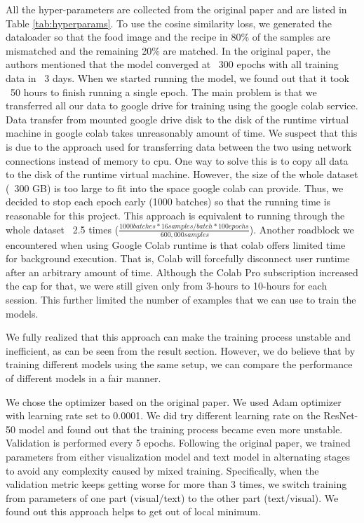\documentclass[10pt,twocolumn,letterpaper]{article}
\begin{document}
All the hyper-parameters are collected from the original paper and are listed in Table \ref{tab:hyperparams}.  To use the cosine similarity loss, we generated the dataloader so that the food image and the recipe in 80\% of the samples are mismatched and the remaining 20\% are matched.  In the original paper, the authors mentioned that the model converged at ~300 epochs with all training data in ~3 days.  When we started running the model, we found out that it took ~50 hours to finish running a single epoch.  The main problem is that we transferred all our data to google drive for training using the google colab service.  Data transfer from mounted google drive disk to the disk of the runtime virtual machine in google colab takes unreasonably amount of time.  We suspect that this is due to the approach used for transferring data between the two using network connections instead of memory to cpu.  One way to solve this is to copy all data to the disk of the runtime virtual machine.  However, the size of the whole dataset (~300 GB) is too large to fit into the space google colab can provide.  Thus, we decided to stop each epoch early (1000 batches) so that the running time is reasonable for this project.  This approach is equivalent to running through the whole dataset ~2.5 times (\(\frac{1000 batches * 16 samples/batch * 100 epochs}{~600,000 samples}\)).  Another roadblock we encountered when using Google Colab runtime is that colab offers limited time for background execution.  That is, Colab will forcefully disconnect user runtime after an arbitrary amount of time. Although the Colab Pro subscription increased the cap for that, we were still given only from 3-hours to 10-hours for each session. This further limited the number of examples that we can use to train the models. 

We fully realized that this approach can make the training process unstable and inefficient, as can be seen from the result section.  However, we do believe that by training different models using the same setup, we can compare the performance of different models in a fair manner.

We chose the optimizer based on the original paper.  We used Adam optimizer with learning rate set to 0.0001.  We did try different learning rate on the ResNet-50 model and found out that the training process became even more unstable.  Validation is performed every 5 epochs.  Following the original paper, we trained parameters from either visualization model and text model in alternating stages to avoid any complexity caused by mixed training.  Specifically, when the validation metric keeps getting worse for more than 3 times, we switch training from parameters of one part (visual/text) to the other part (text/visual).  We found out this approach helps to get out of local minimum.
\end{document}
